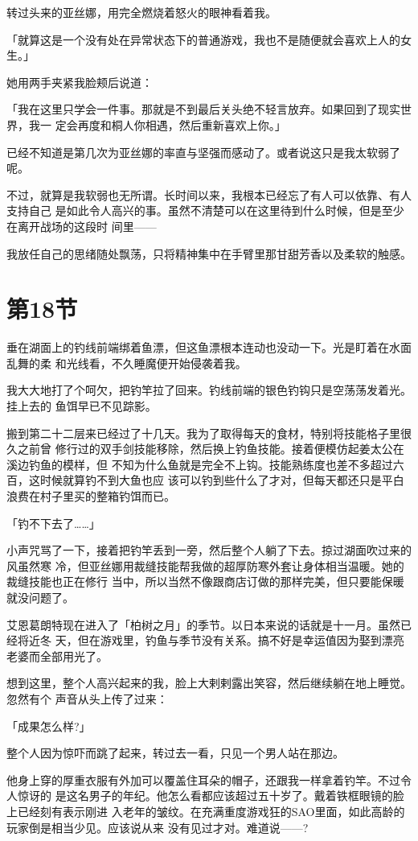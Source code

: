 \documentclass[11pt]{book}
\begin{document}
转过头来的亚丝娜，用完全燃烧着怒火的眼神看着我。

「就算这是一个没有处在异常状态下的普通游戏，我也不是随便就会喜欢上人的女生。」

她用两手夹紧我脸颊后说道：

「我在这里只学会一件事。那就是不到最后关头绝不轻言放弃。如果回到了现实世界，我一
定会再度和桐人你相遇，然后重新喜欢上你。」

已经不知道是第几次为亚丝娜的率直与坚强而感动了。或者说这只是我太软弱了呢。

不过，就算是我软弱也无所谓。长时间以来，我根本已经忘了有人可以依靠、有人支持自己
是如此令人高兴的事。虽然不清楚可以在这里待到什么时候，但是至少在离开战场的这段时
间里——

我放任自己的思绪随处飘荡，只将精神集中在手臂里那甘甜芳香以及柔软的触感。
\section{第18节}
\label{sec:org91401e6}
垂在湖面上的钓线前端绑着鱼漂，但这鱼漂根本连动也没动一下。光是盯着在水面乱舞的柔
和光线看，不久睡魔便开始侵袭着我。

我大大地打了个呵欠，把钓竿拉了回来。钓线前端的银色钓钩只是空荡荡发着光。挂上去的
鱼饵早已不见踪影。

搬到第二十二层来已经过了十几天。我为了取得每天的食材，特别将技能格子里很久之前曾
修行过的双手剑技能移除，然后换上钓鱼技能。接着便模仿起姜太公在溪边钓鱼的模样，但
不知为什么鱼就是完全不上钩。技能熟练度也差不多超过六百，这时候就算钓不到大鱼也应
该可以钓到些什么了才对，但每天都还只是平白浪费在村子里买的整箱钓饵而已。

「钓不下去了……」

小声咒骂了一下，接着把钓竿丢到一旁，然后整个人躺了下去。掠过湖面吹过来的风虽然寒
冷，但亚丝娜用裁缝技能帮我做的超厚防寒外套让身体相当温暖。她的裁缝技能也正在修行
当中，所以当然不像跟商店订做的那样完美，但只要能保暖就没问题了。

艾恩葛朗特现在进入了「柏树之月」的季节。以日本来说的话就是十一月。虽然已经将近冬
天，但在游戏里，钓鱼与季节没有关系。搞不好是幸运值因为娶到漂亮老婆而全部用光了。

想到这里，整个人高兴起来的我，脸上大剌剌露出笑容，然后继续躺在地上睡觉。忽然有个
声音从头上传了过来：

「成果怎么样?」

整个人因为惊吓而跳了起来，转过去一看，只见一个男人站在那边。

他身上穿的厚重衣服有外加可以覆盖住耳朵的帽子，还跟我一样拿着钓竿。不过令人惊讶的
是这名男子的年纪。他怎么看都应该超过五十岁了。戴着铁框眼镜的脸上已经刻有表示刚进
入老年的皱纹。在充满重度游戏狂的SAO里面，如此高龄的玩家倒是相当少见。应该说从来
没有见过才对。难道说——?
\end{document}
